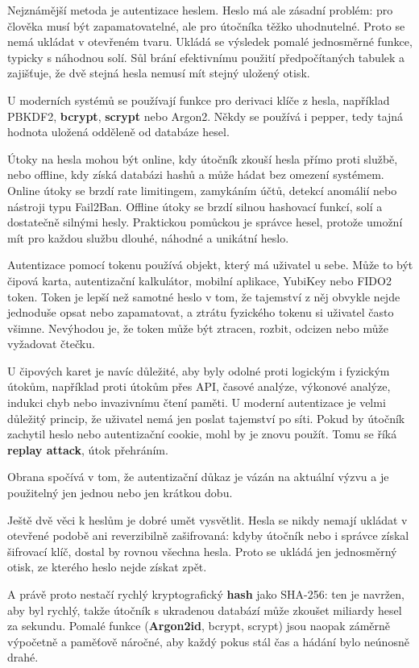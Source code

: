 Nejznámější metoda je autentizace heslem. Heslo má ale zásadní problém: pro člověka musí být zapamatovatelné, ale pro útočníka těžko uhodnutelné. Proto se nemá ukládat v otevřeném tvaru. Ukládá se výsledek pomalé jednosměrné funkce, typicky s náhodnou solí. Sůl brání efektivnímu použití předpočítaných tabulek a zajišťuje, že dvě stejná hesla nemusí mít stejný uložený otisk.

U moderních systémů se používají funkce pro derivaci klíče z hesla, například PBKDF2, \textbf{bcrypt}, \textbf{scrypt} nebo Argon2. Někdy se používá i pepper, tedy tajná hodnota uložená odděleně od databáze hesel.

Útoky na hesla mohou být online, kdy útočník zkouší hesla přímo proti službě, nebo offline, kdy získá databázi hashů a může hádat bez omezení systémem. Online útoky se brzdí rate limitingem, zamykáním účtů, detekcí anomálií nebo nástroji typu Fail2Ban. Offline útoky se brzdí silnou hashovací funkcí, solí a dostatečně silnými hesly. Praktickou pomůckou je správce hesel, protože umožní mít pro každou službu dlouhé, náhodné a unikátní heslo.

Autentizace pomocí tokenu používá objekt, který má uživatel u sebe. Může to být čipová karta, autentizační kalkulátor, mobilní aplikace, YubiKey nebo FIDO2 token. Token je lepší než samotné heslo v tom, že tajemství z něj obvykle nejde jednoduše opsat nebo zapamatovat, a ztrátu fyzického tokenu si uživatel často všimne. Nevýhodou je, že token může být ztracen, rozbit, odcizen nebo může vyžadovat čtečku.

U čipových karet je navíc důležité, aby byly odolné proti logickým i fyzickým útokům, například proti útokům přes API, časové analýze, výkonové analýze, indukci chyb nebo invazivnímu čtení paměti. U moderní autentizace je velmi důležitý princip, že uživatel nemá jen poslat tajemství po síti. Pokud by útočník zachytil heslo nebo autentizační cookie, mohl by je znovu použít. Tomu se říká \textbf{replay attack}, útok přehráním.

Obrana spočívá v tom, že autentizační důkaz je vázán na aktuální výzvu a je použitelný jen jednou nebo jen krátkou dobu.

Ještě dvě věci k heslům je dobré umět vysvětlit. Hesla se nikdy nemají ukládat v otevřené podobě ani reverzibilně zašifrovaná: kdyby útočník nebo i správce získal šifrovací klíč, dostal by rovnou všechna hesla. Proto se ukládá jen jednosměrný otisk, ze kterého heslo nejde získat zpět.

A právě proto nestačí rychlý kryptografický \textbf{hash} jako SHA-256: ten je navržen, aby byl rychlý, takže útočník s ukradenou databází může zkoušet miliardy hesel za sekundu. Pomalé funkce (\textbf{Argon2id}, bcrypt, scrypt) jsou naopak záměrně výpočetně a paměťově náročné, aby každý pokus stál čas a hádání bylo neúnosně drahé.

